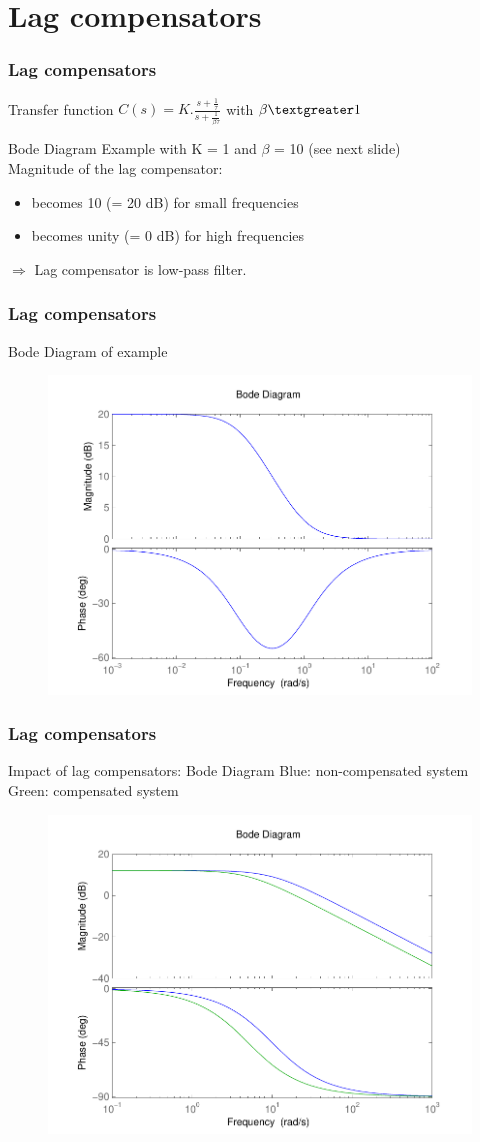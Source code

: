 \section{Lag compensators}

\begin{frame}
	\frametitle{Lag compensators}
	\begin{block}{Transfer function}
		$C(s) = K.\frac{s + \frac{1}{\tau}}{s + \frac{1}{\beta\tau}}$ with $\beta  \textgreater  1$
	\end{block}
	\begin{block}{Bode Diagram}
		Example with K = 1 and $\beta$ = 10 (see next slide) \\ 
		Magnitude of the lag compensator: 
		\begin{itemize}
			\item becomes 10 (= 20 dB) for small frequencies
			\item becomes unity (= 0 dB) for high frequencies
		\end{itemize}
		$\Rightarrow$ Lag compensator is low-pass filter.
		
	\end{block}
\end{frame}

\begin{frame}
\frametitle{Lag compensators}
\begin{block}{Bode Diagram of example}
	\begin{figure}
		\centering
		\includegraphics[width=0.5
		\linewidth]{bodelagislowpass}
	\end{figure}
\end{block}
\end{frame}

\begin{frame}
\frametitle{Lag compensators}
\begin{block}{Impact of lag compensators: Bode Diagram}
	Blue: non-compensated system \\
	Green: compensated system
	\begin{figure}
		\centering
		\includegraphics[width=0.5
		\linewidth]{bodelagimpact}
	\end{figure}
\end{block}
\end{frame}

